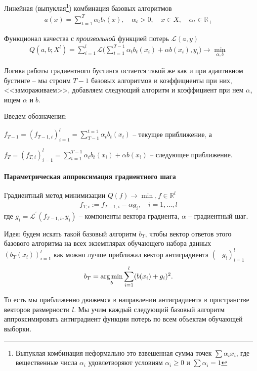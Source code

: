 \documentclass[%
	11pt,
	a4paper,
	utf8,
		]{article}
\begin{document}
Линейная (выпуклая\footnote{Выпуклая комбинация неформально это взвешенная сумма точек $ \sum \alpha_i x_i $, где вещественные числа $ \alpha_i $ удовлетворяют условиям $ \alpha_i \geqslant 0 $ и $ \sum \alpha_i = 1 $}) комбинация базовых алгоритмов
\begin{align*}
	a(x) = \sum_{t = 1}^{T} \alpha_t b_t(x), \quad \alpha_t > 0, \quad x \in X, \quad \alpha_t \in \mathbb{R}_{+}
\end{align*}

Функционал качества с \emph{произвольной} функцией потерь $ \mathcal{L}(a, y) $
\begin{align*}
	Q(a, b; X^l) = \sum_{i=1}^{l} \mathcal{L}\Big( \sum_{t=1}^{T-1} \alpha_t b_t(x_i) + \alpha b(x_i), y_i\Big) \to \underset{\alpha, b}{\min}
\end{align*}

Логика работы градиентного бустинга остается такой же как и при адаптивном бустинге -- мы строим $ T - 1 $ базовых алгоритмов и коэффициенты при них, <<замораживаем>>, добавляем следующий алгоритм и коэффициент при нем $ \alpha $, ищем $ \alpha $ и $ b $.

Введем обозначения:

$ f_{T - 1} = (f_{T - 1, i})_{i = 1}^l = \sum^{t=1}_{T - 1} \alpha_t b_t(x_i) $ -- текущее приближение, а

$ f_T = (f_{T, i})_{i = 1}^l = \sum_{t=1}^{T-1} \alpha_t b_t(x_i) + \alpha b(x_i) $ -- следующее приближение.

\paragraph{Параметрическая аппроксимация градиентного шага} Градиентный метод минимизации $ Q(f) \to \min, f \in \mathbb{R}^l $
\begin{align*}
	f_{T, i} := f_{T-1, i} - \alpha g_i, \quad i = 1, \ldots, l
\end{align*}
где $ g_i = \mathcal{L}^{'}(f_{T-1, i}, y_i) $ -- компоненты вектора градиента, $ \alpha $ -- градиентный шаг.

Идея: будем искать такой базовый алгоритм $ b_T $, чтобы вектор ответов этого базового алгоритма на всех экземплярах обучающего набора данных $ (b_T(x_i))_{i = 1}^l $ как можно лучше приближал вектор антиградиента $ (-g_i)_{i = 1}^l $
\begin{align*}
	b_T = \underset{b}{\operatorname*{arg\,min}} \sum_{i=1}^{l} (b(x_i) + g_i)^2.
\end{align*}

То есть мы приближенно движемся в направлении антиградиента в пространстве векторов размерности $ l $. Мы учим каждый следующий базовый алгоритм аппроксимировать антиградиент функции потерь по всем объектам обучающей выборки.
\end{document}
